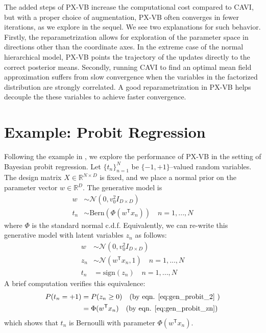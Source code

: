\documentclass{article}
\begin{document}
The added steps of PX-VB increase the computational cost compared to CAVI, but with a proper choice of augmentation,  PX-VB often converges in fewer iterations, as we explore in the sequel. We see two explanations for such behavior. Firstly, the reparametrization allows for exploration of the parameter space in directions other than the coordinate axes. In the extreme case of the normal hierarchical model, PX-VB points the trajectory of the updates directly to the correct posterior means. Secondly, running CAVI to find an optimal mean field approximation suffers from slow convergence when the variables in the factorized distribution are strongly correlated. A good reparametrization in PX-VB helps decouple the these variables to achieve faster convergence. 




\section{Example: Probit Regression}
\label{probit}

Following the example in \cite{Qi}, we explore the performance of PX-VB in the setting of Bayesian probit regression. Let $\{t_n\}_{n=1}^N$ be $\{-1,+1\}$--valued random variables. The design matrix $X\in\mathbb R^{N\times D}$ is fixed, and we place a normal prior on the parameter vector $w\in\mathbb R^D$. The generative model is
\begin{align}
w &\sim \mathcal N (0, v_0^2I_{D\times D}) \\
t_n &\sim \text{Bern}(\Phi(w^\mathsf T x_n))\quad n = 1, ..., N \label{eq:gen_probit_1}
\end{align}
where $\Phi$ is the standard normal c.d.f. Equivalently, we can re-write this generative model with latent variables $z_n$ as follows: 
\begin{align}
    w &\sim \mathcal N (0, v_0^2I_{D\times D}) \\
    z_n &\sim \mathcal N (w^\mathsf T x_n, 1)\quad n = 1, ..., N \label{eq:gen_probit_zn}\\
    t_n &= \text{sign}(z_n) \quad n = 1, ..., N \label{eq:gen_probit_2}
\end{align}
A brief computation verifies this equivalence: 
\begin{align}
P(t_n = +1) &= P(z_n \geq 0) \quad \text{(by eqn. \ref{eq:gen_probit_2} )}\\
&= \Phi(w^\mathsf Tx_n) \quad \text{(by eqn. \ref{eq:gen_probit_zn})}
\end{align}
which shows that $t_n$ is Bernoulli with parameter $\Phi(w^\mathsf Tx_n)$. 
\end{document}
